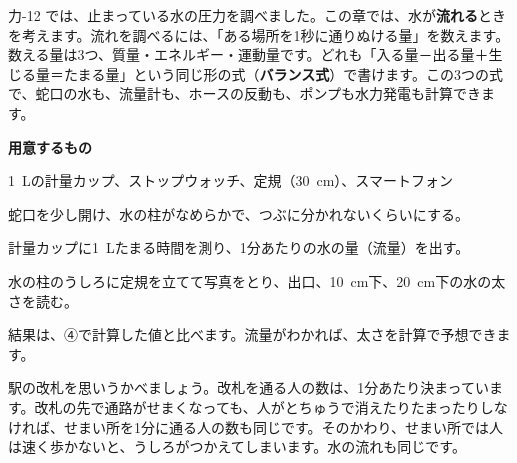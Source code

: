 \noindent 力-12 では、止まっている水の圧力を調べました。この章では、水が\textbf{流れる}ときを考えます。流れを調べるには、「ある場所を1秒に通りぬける量」を数えます。数える量は3つ、質量・エネルギー・運動量です。どれも「入る量－出る量＋生じる量＝たまる量」という同じ形の式（\textbf{バランス式}）で書けます。この3つの式で、蛇口の水も、流量計も、ホースの反動も、ポンプも水力発電も計算できます。

\begin{yattemiyou}[蛇口の水の太さを測ろう]
\textbf{用意するもの}\par
\qty{1}{L}の計量カップ、ストップウォッチ、定規（\qty{30}{cm}）、スマートフォン
\begin{enumerate}[label={\bkcircled[bkGreen]{\arabic*}}, leftmargin=2.4\zw, itemsep=1pt, topsep=2pt]
\item 蛇口を少し開け、水の柱がなめらかで、つぶに分かれないくらいにする。
\item 計量カップに\qty{1}{L}たまる時間を測り、1分あたりの水の量（流量）を出す。
\item 水の柱のうしろに定規を立てて写真をとり、出口、\qty{10}{cm}下、\qty{20}{cm}下の水の太さを読む。
\end{enumerate}
\end{yattemiyou}

\noindent 結果は、④で計算した値と比べます。流量がわかれば、太さを計算で予想できます。

\begin{omoidasou}
\end{omoidasou}




\leavevmode\label{ph:力-13:sec1}駅の改札を思いうかべましょう。改札を通る人の数は、1分あたり決まっています。改札の先で通路がせまくなっても、人がとちゅうで消えたりたまったりしなければ、せまい所を1分に通る人の数も同じです。そのかわり、せまい所では人は速く歩かないと、うしろがつかえてしまいます。水の流れも同じです。


